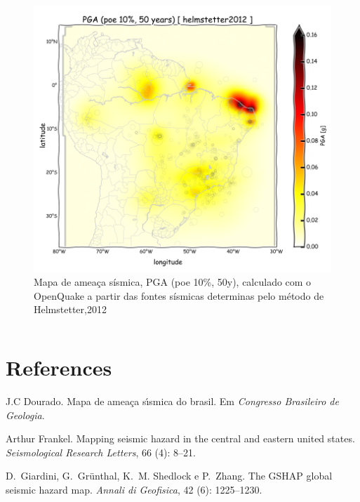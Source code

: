 \documentclass[final]{beamer}
\begin{document}
\begin{poster}
\begin{columns}[t,totalwidth=\textwidth]
\begin{figure}[H]
  \centering
  \includegraphics[width=.98\textwidth]{pga_helmstetter} 
  \caption{Mapa de ameaça sísmica, PGA (poe 10\%, 50y), 
  		   calculado com o OpenQuake a partir das fontes sísmicas
  		   determinas pelo método de Helmstetter,2012 }
  \label{fig:helm_h} 
\end{figure}



\end{columns}


\section{References}
	\scriptsize
%	

J.C Dourado.
Mapa de amea{\c c}a s{\'\i}smica do brasil.
Em \emph{Congresso Brasileiro de Geologia}.

Arthur Frankel.
Mapping seismic hazard in the central and eastern united states.
\emph{Seismological Research Letters}, 66 (4):
  8--21.

D.~Giardini, G.~Gr{\"u}nthal, K.~M. Shedlock e P.~Zhang.
The {GSHAP} global seismic hazard map.
\emph{Annali di Geofisica}, 42 (6): 1225--1230.


\end{poster}
\end{document}
